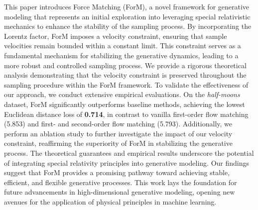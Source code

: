 This paper introduces Force Matching (ForM), a novel framework for generative modeling that represents an initial exploration into leveraging special relativistic mechanics to enhance the stability of the sampling process. By incorporating the Lorentz factor, ForM imposes a velocity constraint, ensuring that sample velocities remain bounded within a constant limit. This constraint serves as a fundamental mechanism for stabilizing the generative dynamics, leading to a more robust and controlled sampling process. 
We provide a rigorous theoretical analysis demonstrating that the velocity constraint is preserved throughout the sampling procedure within the ForM framework. To validate the effectiveness of our approach, we conduct extensive empirical evaluations. On the \textit{half-moons} dataset, ForM significantly outperforms baseline methods, achieving the lowest Euclidean distance loss of \textbf{0.714}, in contrast to vanilla first-order flow matching (5.853) and first- and second-order flow matching (5.793). Additionally, we perform an ablation study to further investigate the impact of our velocity constraint, reaffirming the superiority of ForM in stabilizing the generative process.
The theoretical guarantees and empirical results underscore the potential of integrating special relativity principles into generative modeling. Our findings suggest that ForM provides a promising pathway toward achieving stable, efficient, and flexible generative processes. This work lays the foundation for future advancements in high-dimensional generative modeling, opening new avenues for the application of physical principles in machine learning.

